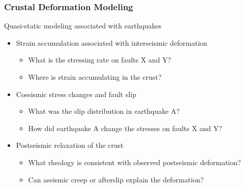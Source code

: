 \documentclass[aspectratio=169]{beamer}
\begin{document}
\begin{frame}
  \frametitle{Crustal Deformation Modeling}

  \vfill
  Quasi-static modeling associated with earthquakes
  \vfill

  \begin{itemize}
  \item Strain accumulation associated with interseismic deformation
    \begin{itemize}
    \item What is the stressing rate on faults X and Y?
    \item Where is strain accumulating in the crust?
    \end{itemize}
  \item Coseismic stress changes and fault slip
    \begin{itemize}
    \item What was the slip distribution in earthquake A?
    \item How did earthquake A change the stresses on faults X and Y?
    \end{itemize}
  \item Postseismic relaxation of the crust
    \begin{itemize}
    \item What rheology is consistent with observed postseismic deformation?
    \item Can aseismic creep or afterslip explain the deformation?
    \end{itemize}
  \end{itemize}
  \vfill

\end{frame}
\end{document}
